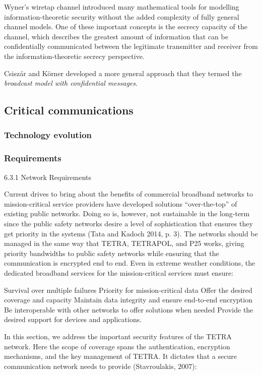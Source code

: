 \documentclass[english, 12pt, a4paper, elec, utf8, a-1b, online]{aaltothesis}
\begin{document}
Wyner's wiretap channel introduced many mathematical tools for modelling information-theoretic security without the added complexity of fully general channel models.
One of these important concepts is the secrecy capacity of the channel, which describes the greatest amount of information that can be confidentially communicated between the legitimate transmitter and receiver from the information-theoretic secrecy perspective.
\cite{bloch2011physical}

Csiszár and Körner \cite{csiszar1978broadcast} developed a more general approach that they termed the \textit{broadcast model with confidential messages}.

\clearpage

\subsection{Critical communications}
\subsubsection{Technology evolution}
\subsubsection{Requirements}
6.3.1 Network Requirements

Current drives to bring about the benefits of commercial broadband networks to mission-critical service providers have developed solutions “over-the-top” of existing public networks.
Doing so is, however, not sustainable in the long-term since the public safety networks desire a level of sophistication that ensures they get priority in the systems (Tata and Kadoch 2014, p.
3).
The networks should be managed in the same way that TETRA, TETRAPOL, and P25 works, giving priority bandwidths to public safety networks while ensuring that the communication is encrypted end to end.
Even in extreme weather conditions, the dedicated broadband services for the mission-critical services must ensure:

    Survival over multiple failures
    Priority for mission‐critical data
    Offer the desired coverage and capacity
    Maintain data integrity and ensure end‐to‐end encryption
    Be interoperable with other networks to offer solutions when needed
    Provide the desired support for devices and applications.




In this section, we address the important security features of the TETRA network.
Here the scope of coverage spans the authentication, encryption mechanisms, and the key management of TETRA.
It dictates that a secure communication network needs to provide (Stavroulakis, 2007):
\end{document}
